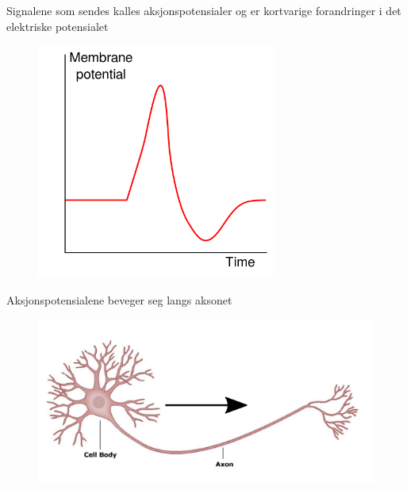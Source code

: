 \documentclass[presentation]{beamer}
\begin{document}
\begin{frame}{Signalene som sendes kalles aksjonspotensialer og er kortvarige forandringer i det elektriske potensialet}
   \begin{figure}
       {\includegraphics[width=0.7\textwidth]{ap.png}}
\end{figure}
\end{frame}


\begin{frame}{Aksjonspotensialene beveger seg langs aksonet}
   \begin{figure}
       {\includegraphics[width=1\textwidth]{neuron2.png}}
\end{figure}
\end{frame}

\end{document}
